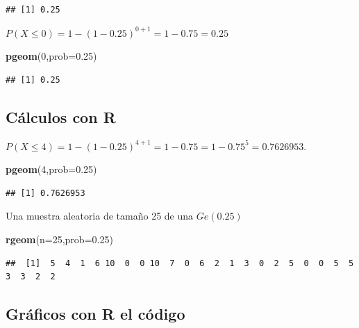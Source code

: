 \documentclass[]{book}
\newenvironment{Shaded}{\begin{snugshade}}{\end{snugshade}}
\newcommand{\DataTypeTok}[1]{\textcolor[rgb]{0.13,0.29,0.53}{#1}}
\newcommand{\DecValTok}[1]{\textcolor[rgb]{0.00,0.00,0.81}{#1}}
\newcommand{\FloatTok}[1]{\textcolor[rgb]{0.00,0.00,0.81}{#1}}
\newcommand{\KeywordTok}[1]{\textcolor[rgb]{0.13,0.29,0.53}{\textbf{#1}}}
\newcommand{\NormalTok}[1]{#1}
\begin{document}
\begin{verbatim}
## [1] 0.25
\end{verbatim}

\(P(X\leq 0)=1- (1-0.25)^{0+1}=1-0.75=0.25\)

\begin{Shaded}
\begin{Highlighting}[]
\KeywordTok{pgeom}\NormalTok{(}\DecValTok{0}\NormalTok{,}\DataTypeTok{prob=}\FloatTok{0.25}\NormalTok{)}
\end{Highlighting}
\end{Shaded}

\begin{verbatim}
## [1] 0.25
\end{verbatim}

\hypertarget{cuxe1lculos-con-r-1}{%
\subsection{Cálculos con R}\label{cuxe1lculos-con-r-1}}

\(P(X\leq 4)=1-(1-0.25)^{4+1}=1-0.75=1-0.75^5=0.7626953.\)

\begin{Shaded}
\begin{Highlighting}[]
\KeywordTok{pgeom}\NormalTok{(}\DecValTok{4}\NormalTok{,}\DataTypeTok{prob=}\FloatTok{0.25}\NormalTok{)}
\end{Highlighting}
\end{Shaded}

\begin{verbatim}
## [1] 0.7626953
\end{verbatim}

Una muestra aleatoria de tamaño 25 de una \(Ge(0.25)\)

\begin{Shaded}
\begin{Highlighting}[]
\KeywordTok{rgeom}\NormalTok{(}\DataTypeTok{n=}\DecValTok{25}\NormalTok{,}\DataTypeTok{prob=}\FloatTok{0.25}\NormalTok{)}
\end{Highlighting}
\end{Shaded}

\begin{verbatim}
##  [1]  5  4  1  6 10  0  0 10  7  0  6  2  1  3  0  2  5  0  0  5  5  3  3  2  2
\end{verbatim}

\hypertarget{gruxe1ficos-con-r-el-cuxf3digo}{%
\subsection{Gráficos con R el código}\label{gruxe1ficos-con-r-el-cuxf3digo}}
\end{document}
